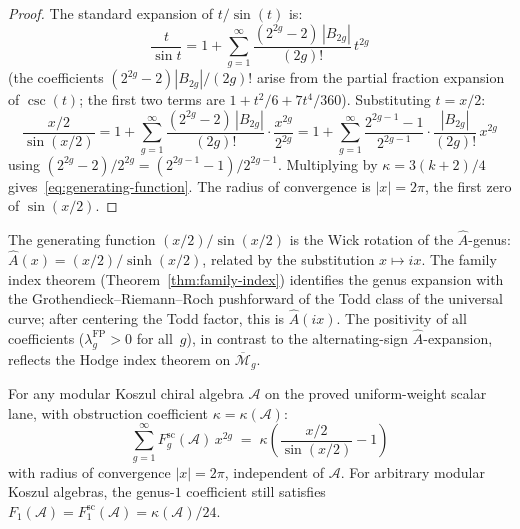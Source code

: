 \begin{proof}
The standard expansion of $t/\sin(t)$ is:
\[
\frac{t}{\sin t} = 1 + \sum_{g=1}^{\infty} \frac{(2^{2g}-2)\,|B_{2g}|}{(2g)!}\, t^{2g}
\]
(the coefficients $(2^{2g}-2)|B_{2g}|/(2g)!$ arise from the partial
fraction expansion of $\csc(t)$; the first two terms are
$1 + t^2/6 + 7t^4/360$). Substituting $t = x/2$:
\[
\frac{x/2}{\sin(x/2)} = 1 + \sum_{g=1}^{\infty} \frac{(2^{2g}-2)\,|B_{2g}|}{(2g)!} \cdot \frac{x^{2g}}{2^{2g}}
= 1 + \sum_{g=1}^{\infty} \frac{2^{2g-1}-1}{2^{2g-1}} \cdot \frac{|B_{2g}|}{(2g)!}\, x^{2g}
\]
using $(2^{2g}-2)/2^{2g} = (2^{2g-1}-1)/2^{2g-1}$. Multiplying by $\kappa = 3(k+2)/4$ gives~\eqref{eq:generating-function}. The radius of convergence is $|x| = 2\pi$, the first zero of $\sin(x/2)$.
\end{proof}

\begin{remark}\label{rem:A-hat-genus}

The generating function $(x/2)/\sin(x/2)$ is the Wick rotation of the
$\hat{A}$-genus: $\hat{A}(x) = (x/2)/\sinh(x/2)$, related by the
substitution $x \mapsto ix$. The family index theorem
(Theorem~\ref{thm:family-index}) identifies the genus expansion with
the Gro\-then\-dieck--Rie\-mann--Roch pushforward of the Todd class of
the universal curve; after centering the Todd factor, this is
$\hat{A}(ix)$. The positivity of all coefficients
($\lambda_g^{\mathrm{FP}} > 0$ for all~$g$), in contrast to the
alternating-sign $\hat{A}$-expansion, reflects the Hodge index
theorem on $\overline{\mathcal{M}}_g$.
\end{remark}

\begin{theorem}\label{thm:universal-generating-function}

For any modular Koszul chiral algebra $\mathcal{A}$ on the proved
uniform-weight scalar lane, with obstruction coefficient
$\kappa = \kappa(\mathcal{A})$:
\begin{equation}\label{eq:universal-generating-function}
\sum_{g=1}^{\infty} F_g^{\mathrm{sc}}(\mathcal{A})\, x^{2g}
\;=\; \kappa \left(\frac{x/2}{\sin(x/2)} - 1\right)
\end{equation}
with radius of convergence $|x| = 2\pi$, independent of $\mathcal{A}$.
For arbitrary modular Koszul algebras, the genus-$1$ coefficient
still satisfies
$F_1(\mathcal{A})=F_1^{\mathrm{sc}}(\mathcal{A})
= \kappa(\mathcal{A})/24$.
\end{theorem}

